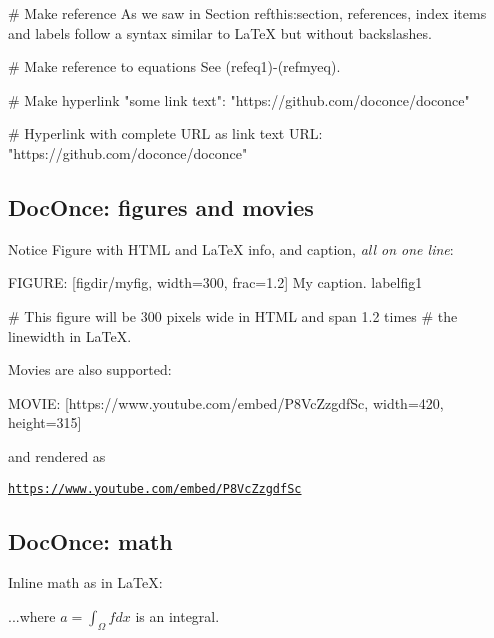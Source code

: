 \documentclass[%
oneside,                 %
final,                   %
10pt]{article}
\newenvironment{doconce:movie}{}{}
\newcounter{doconce:movie:counter}
\begin{document}
# Make reference
As we saw in Section ref{this:section}, references, index
items and labels follow a syntax similar to LaTeX
but without backslashes.

# Make reference to equations
See (ref{eq1})-(ref{myeq}).

# Make hyperlink
"some link text": "https://github.com/doconce/doconce"

# Hyperlink with complete URL as link text
URL: "https://github.com/doconce/doconce"

\edo


\subsection{DocOnce: figures and movies}

\begin{block}{Notice}
Figure with HTML and {\LaTeX} info, and caption, \emph{all on one line}:
\end{block}






\bdat
FIGURE: [figdir/myfig, width=300, frac=1.2] My caption. label{fig1}

# This figure will be 300 pixels wide in HTML and span 1.2 times
# the linewidth in LaTeX.

\edat


Movies are also supported:



\bdat
MOVIE: [https://www.youtube.com/embed/P8VcZzgdfSc, width=420, height=315]

\edat

and rendered as


\begin{doconce:movie}
\begin{center}
\href{{https://www.youtube.com/embed/P8VcZzgdfSc}}{\nolinkurl{https://www.youtube.com/embed/P8VcZzgdfSc}}
\end{center}
\end{doconce:movie}


\subsection{DocOnce: math}

Inline math as in {\LaTeX}:



\bdat
...where $a=\int_{\Omega}fdx$ is an integral.
\end{document}
